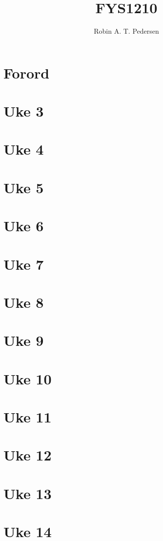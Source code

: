 \documentclass{article}
\begin{document}
  \title{FYS1210}
  \author{Robin A. T. Pedersen}
  \maketitle
  \tableofcontents

  \section{Forord}
    

  \section{Uke 3}
    

  \section{Uke 4}
  \section{Uke 5}
  \section{Uke 6}
  \section{Uke 7}
  \section{Uke 8}
  \section{Uke 9}
  \section{Uke 10}
  \section{Uke 11}
  \section{Uke 12}
  \section{Uke 13}
  \section{Uke 14}
\end{document}
